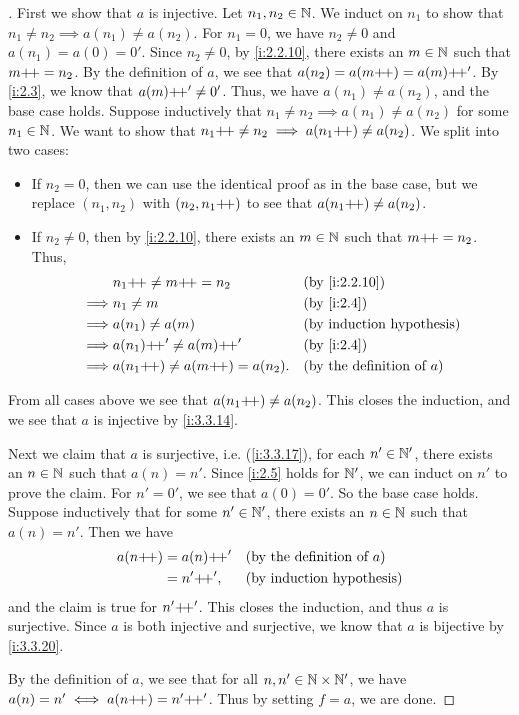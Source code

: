 \begin{proof}[]
  First we show that \(a\) is injective.
  Let \(n_1, n_2 \in \mathbb{N}\).
  We induct on \(n_1\) to show that \(n_1 \neq n_2 \implies a(n_1) \neq a(n_2)\).
  For \(n_1 = 0\), we have \(n_2 \neq 0\) and \(a(n_1) = a(0) = 0'\).
  Since \(n_2 \neq 0\), by \cref{i:2.2.10}, there exists an \(m \in \mathbb{N}\) such that \(m{+}\!{+} = n_2\).
  By the definition of \(a\), we see that \(a(n_2) = a(m{+}\!{+}) = a(m){+}\!{+}'\).
  By \cref{i:2.3}, we know that \(a(m){+}\!{+}' \neq 0'\).
  Thus, we have \(a(n_1) \neq a(n_2)\), and the base case holds.
  Suppose inductively that \(n_1 \neq n_2 \implies a(n_1) \neq a(n_2)\) for some \(n_1 \in \mathbb{N}\).
  We want to show that \(n_1{+}\!{+} \neq n_2 \implies a(n_1{+}\!{+}) \neq a(n_2)\).
  We split into two cases:
  \begin{itemize}
    \item If \(n_2 = 0\), then we can use the identical proof as in the base case, but we replace \((n_1, n_2)\) with \((n_2, n_1{+}\!{+})\) to see that \(a(n_1{+}\!{+}) \neq a(n_2)\).
    \item If \(n_2 \neq 0\), then by \cref{i:2.2.10}, there exists an \(m \in \mathbb{N}\) such that \(m{+}\!{+} = n_2\).
          Thus,
          \begin{align*}
                     & n_1\pp \neq m\pp = n_2           &  & \by{i:2.2.10}                       \\
            \implies & n_1 \neq m                       &  & \by{i:2.4}                          \\
            \implies & a(n_1) \neq a(m)                 &  & \byIH                               \\
            \implies & a(n_1)\pp' \neq a(m)\pp'         &  & \by{i:2.4}                          \\
            \implies & a(n_1\pp) \neq a(m\pp) = a(n_2). &  & \text{(by the definition of \(a\))}
          \end{align*}
  \end{itemize}
  From all cases above we see that \(a(n_1{+}\!{+}) \neq a(n_2)\).
  This closes the induction, and we see that \(a\) is injective by \cref{i:3.3.14}.

  Next we claim that \(a\) is surjective, i.e. (\cref{i:3.3.17}), for each \(n' \in \mathbb{N}'\), there exists an \(n \in \mathbb{N}\) such that \(a(n) = n'\).
  Since \cref{i:2.5} holds for \(\mathbb{N}'\), we can induct on \(n'\) to prove the claim.
  For \(n' = 0'\), we see that \(a(0) = 0'\).
  So the base case holds.
  Suppose inductively that for some \(n' \in \mathbb{N}'\), there exists an \(n \in \mathbb{N}\) such that \(a(n) = n'\).
  Then we have
  \begin{align*}
    a(n{+}\!{+}) & = a(n){+}\!{+}' &  & \text{(by the definition of \(a\))} \\
            & = n'{+}\!{+}',  &  & \text{(by induction hypothesis)}
  \end{align*}
  and the claim is true for \(n'{+}\!{+}'\).
  This closes the induction, and thus \(a\) is surjective.
  Since \(a\) is both injective and surjective, we know that \(a\) is bijective by \cref{i:3.3.20}.

  By the definition of \(a\), we see that for all \(n, n' \in \mathbb{N} \times \mathbb{N}'\), we have \(a(n) = n' \iff a(n{+}\!{+}) = n'{+}\!{+}'\).
  Thus by setting \(f = a\), we are done.
\end{proof}
